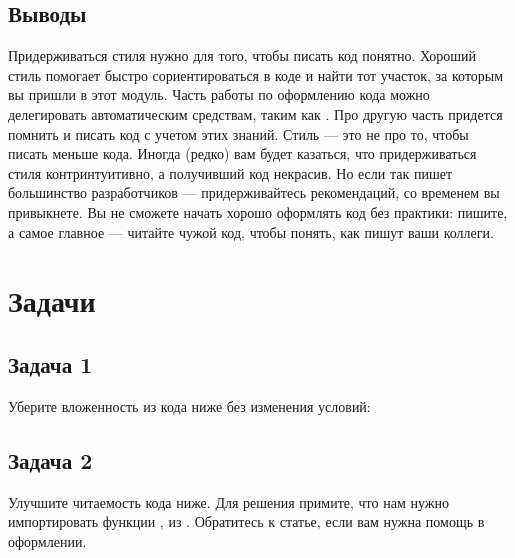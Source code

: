 \documentclass[letterpaper,10pt,russian]{sphinxmanual}
\begin{document}
\subsection{Выводы}
\label{\detokenize{educational_materials/styles/content:id7}}
\sphinxAtStartPar
Придерживаться стиля нужно для того, чтобы писать код понятно. Хороший стиль помогает быстро сориентироваться в коде и найти тот участок, за которым вы пришли в этот модуль. Часть работы по оформлению кода можно делегировать автоматическим средствам, таким как . Про другую часть придется помнить и писать код с учетом этих знаний. Стиль — это не про то, чтобы писать меньше кода. Иногда (редко) вам будет казаться, что придерживаться стиля контринтуитивно, а получивший код некрасив. Но если так пишет большинство разработчиков — придерживайтесь рекомендаций, со временем вы привыкнете. Вы не сможете начать хорошо оформлять код без практики: пишите, а самое главное — читайте чужой код, чтобы понять, как пишут ваши коллеги.

\sphinxstepscope


\section{Задачи}
\label{\detokenize{educational_materials/styles/exercises:id1}}\label{\detokenize{educational_materials/styles/exercises::doc}}

\subsection{Задача 1}
\label{\detokenize{educational_materials/styles/exercises:id2}}
\sphinxAtStartPar
Уберите вложенность из кода ниже без изменения условий:

\begin{sphinxVerbatim}[commandchars=\\\{\}]
   
       
           
                
                     
     
\end{sphinxVerbatim}


\subsection{Задача 2}
\label{\detokenize{educational_materials/styles/exercises:id3}}
\sphinxAtStartPar
Улучшите читаемость кода ниже. Для решения примите, что нам нужно импортировать функции ,  из . Обратитесь к  статье, если вам нужна помощь в оформлении.
\end{document}

